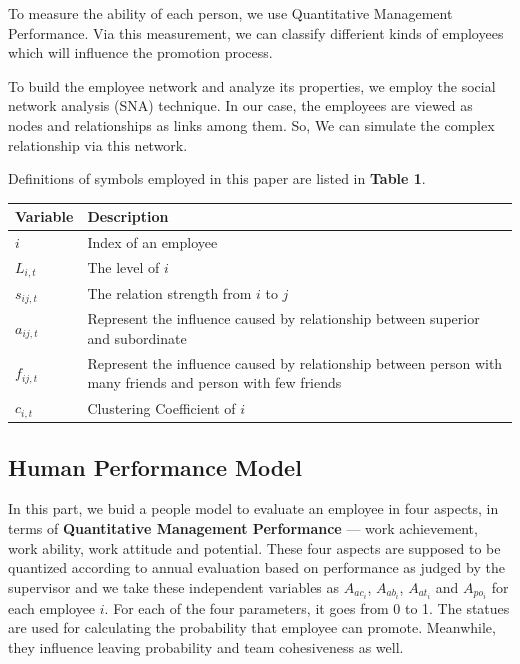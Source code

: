 \documentclass[12pt,a4paper,titlepage]{article}
\begin{document}
To measure the ability of each person, we use Quantitative Management
Performance. Via this measurement, we can classify differient kinds of
employees which will influence the promotion process.

To build the employee network and analyze its properties, we employ
the social network analysis (SNA) technique. In our case, the
employees are viewed as nodes and relationships as links among
them. So, We can simulate the complex relationship via this network.

Definitions of symbols employed in this paper are listed in
\textbf{Table 1}.
\begin{table}
\begin{tabular}{|l|l|}
  Variable & Description \\
  \hline
  $i$            &Index of an employee \\
  $L_{i,t}$          &The level of $i$ \\
  $s_{ij,t}$        &The relation strength from $i$ to $j$ \\
  $a_{ij,t}$        &Represent the influence caused by relationship
                    between superior and subordinate \\
  $f_{ij,t}$        &Represent the influence caused by relationship
                    between person with many friends and person with
                    few friends \\
  $c_{i,t}$        &Clustering Coefficient of $i$
\end{tabular}
\end{table}

\subsection{Human Performance Model}
\label{sec:human-model}

In this part, we buid a people model to evaluate an employee in four
aspects, in terms of \textbf{Quantitative Management Performance} ---
work achievement, work ability, work attitude and potential. These
four aspects are supposed to be quantized according to annual
evaluation based on performance as judged by the supervisor and we
take these independent variables as $A_{ac_i}$, $A_{ab_i}$, $A_{at_i}$
and $A_{po_i}$ for each employee $i$. For each of the four parameters,
it goes from 0 to 1. The statues are used for calculating the
probability that employee can promote. Meanwhile, they influence
leaving probability and team cohesiveness as well.
\end{document}
